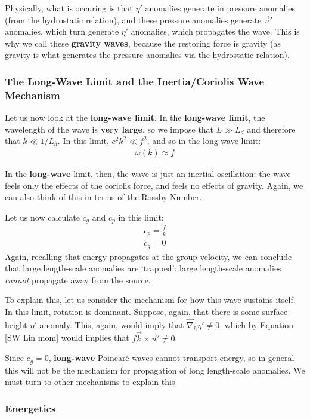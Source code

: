 Physically, what is occuring is that $\eta'$ anomalies generate in pressure anomalies (from the hydrostatic relation), and these pressure anomalies generate $\vec{u}'$ anomalies, which turn generate $\eta'$ anomalies, which propagates the wave. This is why we call these \textbf{gravity waves}, because the restoring force is gravity (as gravity is what generates the pressure anomalies via the hydrostatic relation).

\subsubsection{The Long-Wave Limit and the Inertia/Coriolis Wave Mechanism}

Let us now look at the \textbf{long-wave limit}. In the \textbf{long-wave limit}, the wavelength of the wave is \textbf{very large}, so we impose that $L\gg L_d$ and therefore that $k \ll 1/L_d$. In this limit, $c^2k^2\ll f^2$, and so in the long-wave limit:
\begin{align*}
    \boxed{\omega(k)\approx f}
\end{align*}

In the \textbf{long-wave} limit, then, the wave is just an inertial oscillation: the wave feels only the effects of the coriolis force, and feels no effects of gravity. Again, we can also think of this in terms of the Rossby Number.

Let us now calculate $c_g$ and $c_p$ in this limit:
\begin{align*}
    c_p = \frac{f}{k}\\
    c_g = 0
\end{align*}
Again, recalling that energy propagates at the group velocity, we can conclude that large length-scale anomalies are `trapped': large length-scale anomalies \textit{cannot} propagate away from the source. 

To explain this, let us consider the mechanism for how this wave sustains itself. In this limit, rotation is dominant. Suppose, again, that there is some surface height $\eta'$ anomaly. This, again, would imply that $\vec{\nabla}_h\eta'\neq 0$, which by Equation \ref{SW Lin mom} would implies that $f\vec{k}\times\vec{u}'\neq0$.

Since $c_g=0$, \textbf{long-wave} Poincaré waves cannot transport energy, so in general this will not be the mechanism for propagation of long length-scale anomalies. We must turn to other mechanisms to explain this.

\subsubsection{Energetics}

